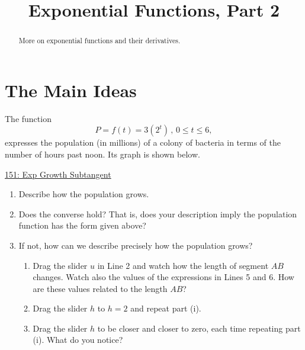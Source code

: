 \documentclass{ximera}
\title{Exponential Functions, Part 2}
\begin{document}
\begin{abstract}
More on exponential functions and their derivatives. 
\end{abstract}
\maketitle


\section{The Main Ideas}
\begin{question}
The function 
\[
   P =f(t) =3 (2^t) \, , \, 0\leq t \leq 6 ,
\]
expresses the population (in millions) of a colony of bacteria in terms of the number of hours past noon. Its graph is shown below.

\href{https://www.desmos.com/calculator/ri5r9suauk}{151: Exp Growth Subtangent}

 
\begin{onlineOnly}
    \begin{center}
\end{center}
\end{onlineOnly}

\begin{enumerate}
\item Describe how the population grows.

\item Does the converse hold? That is, does your description imply the population function has the form given above?

\item If not, how can we describe precisely how the population grows?

\begin{enumerate}
\item Drag the slider $u$ in Line 2 and watch how the length of segment $AB$ changes. Watch also the values of the expressions in Lines 5 and 6. How are these values related to the length $AB$?

\item Drag the slider $h$ to $h=2$ and repeat part (i).

\item Drag the slider $h$ to be closer and closer to zero, each time repeating part (i). What do you notice? 

\end{enumerate}

\end{enumerate}

\end{question}
\end{document}
